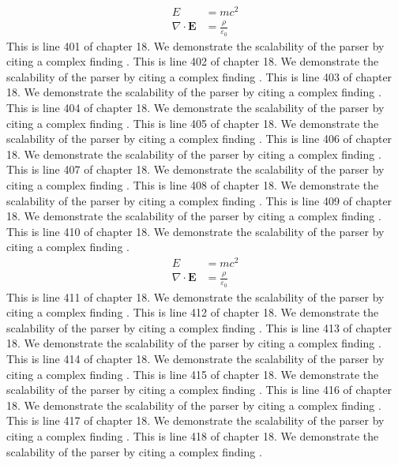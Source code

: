\begin{align*}
  E &= mc^2 \\
  \nabla \cdot \mathbf{E} &= \frac{\rho}{\varepsilon_0}
\end{align*}
This is line 401 of chapter 18. We demonstrate the scalability of the parser by citing a complex finding \cite{ref18_401}.
This is line 402 of chapter 18. We demonstrate the scalability of the parser by citing a complex finding \cite{ref18_402}.
This is line 403 of chapter 18. We demonstrate the scalability of the parser by citing a complex finding \cite{ref18_403}.
This is line 404 of chapter 18. We demonstrate the scalability of the parser by citing a complex finding \cite{ref18_404}.
This is line 405 of chapter 18. We demonstrate the scalability of the parser by citing a complex finding \cite{ref18_405}.
This is line 406 of chapter 18. We demonstrate the scalability of the parser by citing a complex finding \cite{ref18_406}.
This is line 407 of chapter 18. We demonstrate the scalability of the parser by citing a complex finding \cite{ref18_407}.
This is line 408 of chapter 18. We demonstrate the scalability of the parser by citing a complex finding \cite{ref18_408}.
This is line 409 of chapter 18. We demonstrate the scalability of the parser by citing a complex finding \cite{ref18_409}.
This is line 410 of chapter 18. We demonstrate the scalability of the parser by citing a complex finding \cite{ref18_410}.
\begin{align*}
  E &= mc^2 \\
  \nabla \cdot \mathbf{E} &= \frac{\rho}{\varepsilon_0}
\end{align*}
This is line 411 of chapter 18. We demonstrate the scalability of the parser by citing a complex finding \cite{ref18_411}.
This is line 412 of chapter 18. We demonstrate the scalability of the parser by citing a complex finding \cite{ref18_412}.
This is line 413 of chapter 18. We demonstrate the scalability of the parser by citing a complex finding \cite{ref18_413}.
This is line 414 of chapter 18. We demonstrate the scalability of the parser by citing a complex finding \cite{ref18_414}.
This is line 415 of chapter 18. We demonstrate the scalability of the parser by citing a complex finding \cite{ref18_415}.
This is line 416 of chapter 18. We demonstrate the scalability of the parser by citing a complex finding \cite{ref18_416}.
This is line 417 of chapter 18. We demonstrate the scalability of the parser by citing a complex finding \cite{ref18_417}.
This is line 418 of chapter 18. We demonstrate the scalability of the parser by citing a complex finding \cite{ref18_418}.
